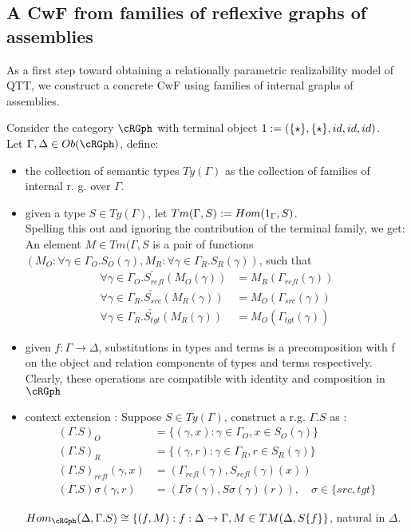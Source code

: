 \documentclass[12pt,a4paper]{article}
\def\src{_{src}}\alwaysmath{src}
\def\rfl{_{refl}}\alwaysmath{rfl}
\def\tgt{_{tgt}}\alwaysmath{tgt}
\renewcommand{\O}{_{O}}\alwaysmath{O}
\def\R{_{R}}\alwaysmath{R}
\begin{document}
\subsection*{A CwF from families of reflexive graphs of assemblies}
As a first step toward obtaining a relationally parametric realizability model of QTT, we construct a concrete CwF using families of internal graphs of assemblies.

Consider the category $\cRGph$ with terminal object $1 := (\{\star\}, \{\star\}, id, id, id)$.\\
Let $\Gamma, \Delta \in \ob\cRGph$, define: 
\begin{itemize}[noitemsep]
  \item the collection of semantic types $Ty(\Gamma)$ as the collection of families of internal r. g. over $\Gamma$.
  
  \item given a type $S \in Ty(\Gamma)$, let $Tm(\Gamma, S) := Hom(1_\Gamma, S)$.\\
  Spelling this out and ignoring the contribution of the terminal family, we get:\\
  An element $M \in Tm(\Gamma, S$ is a pair of functions $(M\O : \forall \gamma \in \Gamma\O. S\O(\gamma), M\R : \forall \gamma \in \Gamma\R. S\R(\gamma))$, such that 
  \begin{align*}
    \forall \gamma \in \Gamma\O.\check {S\rfl} (M\O(\gamma)) &= M\R(\Gamma\rfl(\gamma))\\
    \forall \gamma \in \Gamma\R.\check {S\src} (M\R(\gamma)) &= M\O(\Gamma\src(\gamma))\\
    \forall \gamma \in \Gamma\R.\check {S\tgt} (M\R(\gamma)) &= M\O(\Gamma\tgt(\gamma)) 
  \end{align*}
  
  \item given $f : \Gamma \to \Delta$, substitutions in types and terms is a precomposition with f on the object and relation components of types and terms respectively. Clearly, these operations are compatible with identity and composition in $\cRGph$
  
  \item context extension : Suppose $S \in Ty(\Gamma)$, construct a r.g. $\Gamma.S$ as :
  \begin{align*}
    (\Gamma.S)\O &= \{(\gamma, x) : \gamma \in \Gamma\O, x \in S\O(\gamma)\}\\
    (\Gamma.S)\R &= \{(\gamma, r) : \gamma \in \Gamma\R, r \in S\R(\gamma)\}\\
    (\Gamma.S)\rfl(\gamma, x) &= (\Gamma\rfl(\gamma), S\rfl(\gamma)(x))\\
    (\Gamma.S)\sigma(\gamma, r) &= (\Gamma\sigma(\gamma), S\sigma(\gamma)(r)),\quad \sigma \in \{src, tgt\}
  \end{align*}
  \begin{claim}
    $Hom_{\cRGph}(\Delta, \Gamma.S) \cong \{(f,M): f : \Delta \to \Gamma, M \in TM(\Delta, S\{f\}\}$, natural in $\Delta$.
  \end{claim}
\end{itemize}
\end{document}
